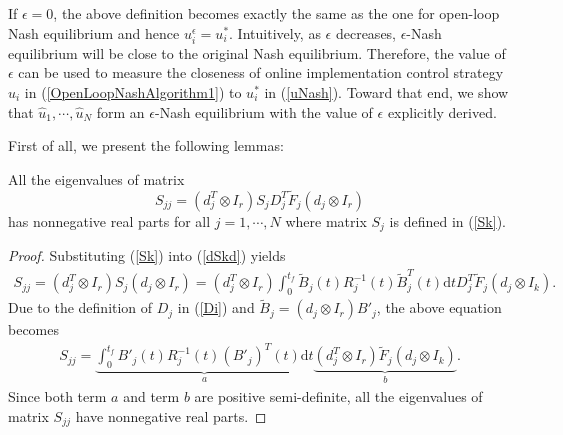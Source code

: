 \documentclass[12pt,draftcls,onecolumn]{IEEEtran}  %
\begin{document}
If $\epsilon=0$, the above definition becomes exactly the same as the one for open-loop Nash equilibrium and hence $u^\epsilon_i=u^*_i$. Intuitively, as $\epsilon$ decreases, $\epsilon$-Nash equilibrium will be close to the original Nash equilibrium. Therefore, the value of $\epsilon$ can be used to measure the closeness of online implementation control strategy $\hat{u}_i$ in (\ref{OpenLoopNashAlgorithm1}) to $u^*_i$ in (\ref{uNash}). Toward that end, we show that $\hat{u}_1,\cdots,\hat{u}_N$ form an $\epsilon$-Nash equilibrium with the value of $\epsilon$ explicitly derived. 

First of all, we present the following lemmas:
\begin{Lem}\label{LemmaEigen}
All the eigenvalues of matrix
\begin{equation}
S_{jj}=(d_j^T\otimes I_r)S_jD_j^T\tilde{F}_j(d_j\otimes I_r)\label{dSkd}
\end{equation}
has nonnegative real parts for all $j=1,\cdots,N$ where matrix $S_j$ is
defined in (\ref{Sk}).
\end{Lem}
\begin{proof}
Substituting (\ref{Sk}) into (\ref{dSkd}) yields
\begin{align*}
S_{jj}=(d_j^T\otimes I_r)S_j(d_j\otimes I_r)=(d_j^T\otimes I_r) \int^{t_f}_0
\tilde{B}_j(t)R_j^{-1}(t)\tilde{B}_j^T(t) \mbox{d}t
D_j^T\tilde{F}_j(d_j\otimes I_k).
\end{align*}
Due to the definition of $D_j$ in (\ref{Di}) and $\tilde{B}_j=(d_j\otimes
I_r)B'_j$, the above equation becomes
\begin{align*}
S_{jj}=\underbrace{\int^{t_f}_0 B'_j(t)R_j^{-1}(t)(B'_j)^T(t)\mbox{d}t}_a
\underbrace{ (d_j^T\otimes I_r)\tilde{F}_j(d_j\otimes I_k)}_b.
\end{align*}
Since both term $a$ and term $b$ are positive semi-definite, all the
eigenvalues of matrix $S_{jj}$ have nonnegative real parts.
\end{proof}
\end{document}
